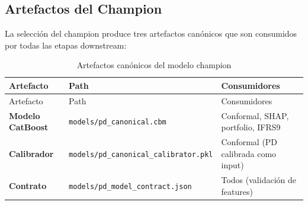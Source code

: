 \documentclass[
  spanish,
  11pt,
  letterpaper,
]{scrbook}
\theoremstyle{plain}
\theoremstyle{remark}
\begin{document}
\subsection{Artefactos del Champion}\label{artefactos-del-champion}

La selección del champion produce tres artefactos canónicos que son
consumidos por todas las etapas downstream:

\begin{longtable}[]{@{}
  >{\raggedright\arraybackslash}p{}
  >{\raggedright\arraybackslash}p{}
  >{\raggedright\arraybackslash}p{}@{}}
\caption{Artefactos canónicos del modelo
champion}\label{tbl-champion-artifacts}\tabularnewline
\toprule\noalign{}
\begin{minipage}[b]{\linewidth}\raggedright
Artefacto
\end{minipage} & \begin{minipage}[b]{\linewidth}\raggedright
Path
\end{minipage} & \begin{minipage}[b]{\linewidth}\raggedright
Consumidores
\end{minipage} \\
\midrule\noalign{}
\endfirsthead
\toprule\noalign{}
\begin{minipage}[b]{\linewidth}\raggedright
Artefacto
\end{minipage} & \begin{minipage}[b]{\linewidth}\raggedright
Path
\end{minipage} & \begin{minipage}[b]{\linewidth}\raggedright
Consumidores
\end{minipage} \\
\midrule\noalign{}
\endhead
\bottomrule\noalign{}
\endlastfoot
\textbf{Modelo CatBoost} & \texttt{models/pd\_canonical.cbm} &
Conformal, SHAP, portfolio, IFRS9 \\
\textbf{Calibrador} & \texttt{models/pd\_canonical\_calibrator.pkl} &
Conformal (PD calibrada como input) \\
\textbf{Contrato} & \texttt{models/pd\_model\_contract.json} & Todos
(validación de features) \\
\end{longtable}
\end{document}

